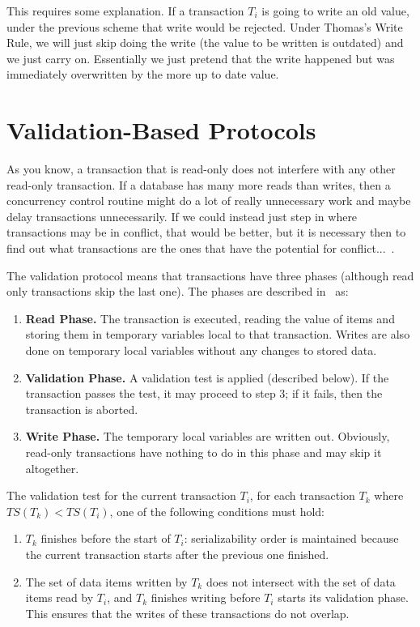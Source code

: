 This requires some explanation. If a transaction $T_{i}$ is going to write an old value, under the previous scheme that write would be rejected. Under Thomas's Write Rule, we will just skip doing the write (the value to be written is outdated) and we just carry on. Essentially we just pretend that the write happened but was immediately overwritten by the more up to date value. 

\section*{Validation-Based Protocols}

As you know, a transaction that is read-only does not interfere with any other read-only transaction. If a database has many more reads than writes, then a concurrency control routine might do a lot of really unnecessary work and maybe delay transactions unnecessarily. If we could instead just step in where transactions may be in conflict, that would be better, but it is necessary then to find out what transactions are the ones that have the potential for conflict...~\cite{dsc}.

The validation protocol means that transactions have three phases (although read only transactions skip the last one). The phases are described in~\cite{dsc} as:

\begin{enumerate}
	\item \textbf{Read Phase.} The transaction is executed, reading the value of items and storing them in temporary variables local to that transaction. Writes are also done on temporary local variables without any changes to stored data.
	\item \textbf{Validation Phase.} A validation test is applied (described below). If the transaction passes the test, it may proceed to step 3; if it fails, then the transaction is aborted.
	\item \textbf{Write Phase.} The temporary local variables are written out. Obviously, read-only transactions have nothing to do in this phase and may skip it altogether.
	
\end{enumerate}

The validation test for the current transaction $T_{i}$, for each transaction $T_{k}$ where $T\!S(T_{k}) < T\!S(T_{i})$, one of the following conditions must hold:

\begin{enumerate}
	\item $T_{k}$ finishes before the start of $T_{i}$: serializability order is maintained because the current transaction starts after the previous one finished.
	\item The set of data items written by $T_{k}$ does not intersect with the set of data items read by $T_{i}$, and $T_{k}$ finishes writing before $T_{i}$ starts its validation phase. This ensures that the writes of these transactions do not overlap.
\end{enumerate} 

